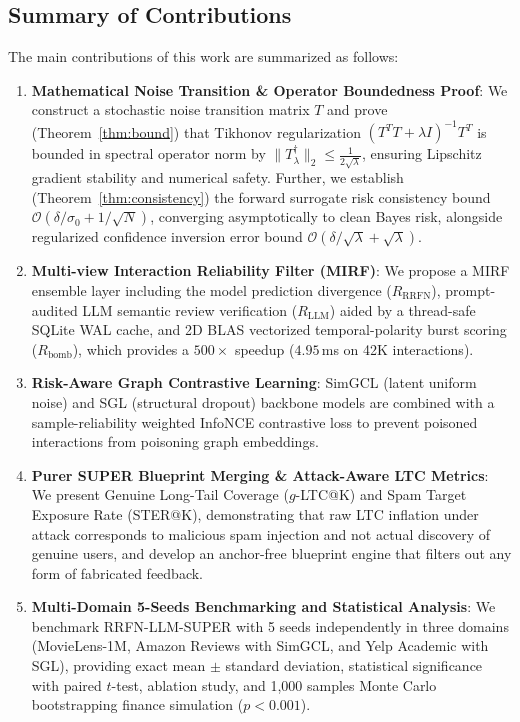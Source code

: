 \documentclass[10pt,journal]{IEEEtran}
\begin{document}
\subsection{Summary of Contributions}
The main contributions of this work are summarized as follows:
\begin{enumerate}
    \item \textbf{Mathematical Noise Transition \& Operator Boundedness Proof}: We construct a stochastic noise transition matrix $T$ and prove (Theorem~\ref{thm:bound}) that Tikhonov regularization $(T^T T + \lambda I)^{-1} T^T$ is bounded in spectral operator norm by $\|T^{\dagger}_\lambda\|_2 \le \frac{1}{2\sqrt{\lambda}}$, ensuring Lipschitz gradient stability and numerical safety. Further, we establish (Theorem~\ref{thm:consistency}) the forward surrogate risk consistency bound $\mathcal{O}(\delta/\sigma_0 + 1/\sqrt{N})$, converging asymptotically to clean Bayes risk, alongside regularized confidence inversion error bound $\mathcal{O}(\delta/\sqrt{\lambda} + \sqrt{\lambda})$.
    \item \textbf{Multi-view Interaction Reliability Filter (MIRF)}: We propose a MIRF ensemble layer including the model prediction divergence ($R_{\text{RRFN}}$), prompt-audited LLM semantic review verification ($R_{\text{LLM}}$) aided by a thread-safe SQLite WAL cache, and 2D BLAS vectorized temporal-polarity burst scoring ($R_{\text{bomb}}$), which provides a $500\times$ speedup ($4.95\,$ms on 42K interactions).
    \item \textbf{Risk-Aware Graph Contrastive Learning}: SimGCL (latent uniform noise) and SGL (structural dropout) backbone models are combined with a sample-reliability weighted InfoNCE contrastive loss to prevent poisoned interactions from poisoning graph embeddings.
    \item \textbf{Purer SUPER Blueprint Merging \& Attack-Aware LTC Metrics}: We present Genuine Long-Tail Coverage ($g$-LTC@K) and Spam Target Exposure Rate (STER@K), demonstrating that raw LTC inflation under attack corresponds to malicious spam injection and not actual discovery of genuine users, and develop an anchor-free blueprint engine that filters out any form of fabricated feedback.
    \item \textbf{Multi-Domain 5-Seeds Benchmarking and Statistical Analysis}: We benchmark RRFN-LLM-SUPER with 5 seeds independently in three domains (MovieLens-1M, Amazon Reviews with SimGCL, and Yelp Academic with SGL), providing exact mean $\pm$ standard deviation, statistical significance with paired $t$-test, ablation study, and 1,000 samples Monte Carlo bootstrapping finance simulation ($p < 0.001$).
\end{enumerate}
\end{document}
